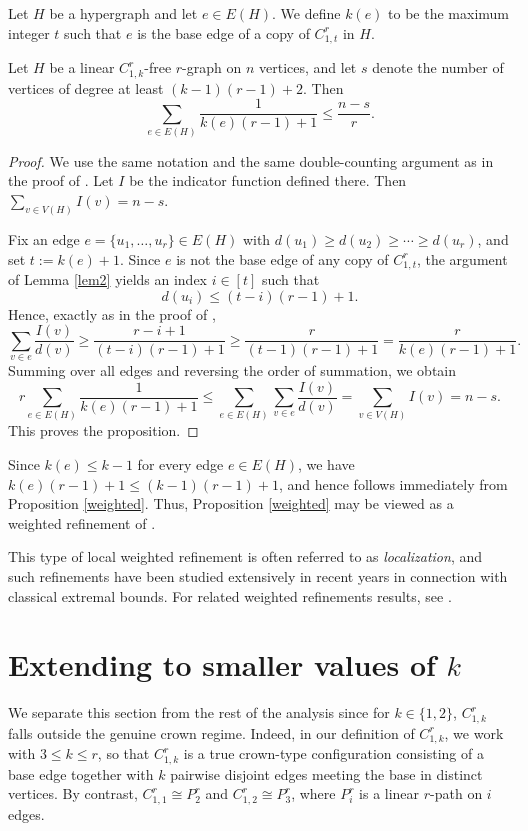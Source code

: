 \documentclass[12pt]{article}
\begin{document}
\begin{definition}
Let $H$ be a hypergraph and let $e\in E(H)$. We define $k(e)$ to be the maximum integer $t$ such that $e$ is the base edge of a copy of $C_{1,t}^r$ in $H$.
\end{definition}

\begin{proposition}\label{weighted}
Let $H$ be a linear $C_{1,k}^r$-free $r$-graph on $n$ vertices, and let $s$ denote the number of vertices of degree at least $(k-1)(r-1)+2$. Then
\[
\sum_{e\in E(H)} \frac{1}{k(e)(r-1)+1} \le \frac{n-s}{r}.
\]
\end{proposition}

\begin{proof}
We use the same notation and the same double-counting argument as in the proof of . Let $I$ be the indicator function defined there. Then
$\sum_{v\in V(H)} I(v)=n-s$.

Fix an edge $e=\{u_1,\dots,u_r\}\in E(H)$ with $d(u_1)\ge d(u_2)\ge \cdots \ge d(u_r)$,
and set $t:=k(e)+1$. Since $e$ is not the base edge of any copy of $C_{1,t}^r$, the argument of Lemma \ref{lem2} yields an index $i\in [t]$ such that
\[
d(u_i)\le (t-i)(r-1)+1.
\]
Hence, exactly as in the proof of ,
\[
\sum_{v\in e}\frac{I(v)}{d(v)}
\ge \frac{r-i+1}{(t-i)(r-1)+1}
\ge \frac{r}{(t-1)(r-1)+1}
= \frac{r}{k(e)(r-1)+1}.
\]
Summing over all edges and reversing the order of summation, we obtain
\[
r\sum_{e\in E(H)}\frac{1}{k(e)(r-1)+1}
\le
\sum_{e\in E(H)}\sum_{v\in e}\frac{I(v)}{d(v)}
=
\sum_{v\in V(H)} I(v)
=
n-s.
\]
This proves the proposition.
\end{proof}

Since $k(e)\le k-1$ for every edge $e\in E(H)$, we have
$k(e)(r-1)+1\le (k-1)(r-1)+1$,
and hence  follows immediately from Proposition \ref{weighted}. Thus, Proposition \ref{weighted} may be viewed as a weighted refinement of .

This type of local weighted refinement is often referred to as \emph{localization}, and such refinements have been studied extensively in recent years in connection with classical extremal bounds. For related weighted refinements results, see \cite{adak2025vertex,adak2026localization,malec2023localized,zhao2025localized}.


\section{Extending  to smaller values of $k$}
We separate this section from the rest of the analysis since for $k\in \{1,2\}$, $C^r_{1,k}$ falls outside the genuine crown regime.
Indeed, in our definition of $C_{1,k}^r$, we work with $3 \le k \le r$, so that
$C_{1,k}^r$ is a true crown-type configuration consisting of a base edge together with
$k$ pairwise disjoint edges meeting the base in distinct vertices. By contrast, $C^r_{1,1} \cong P^r_2$ and $C^r_{1,2} \cong P^r_3$, where $P^r_{i}$ is a linear $r$-path on $i$ edges.
\end{document}
